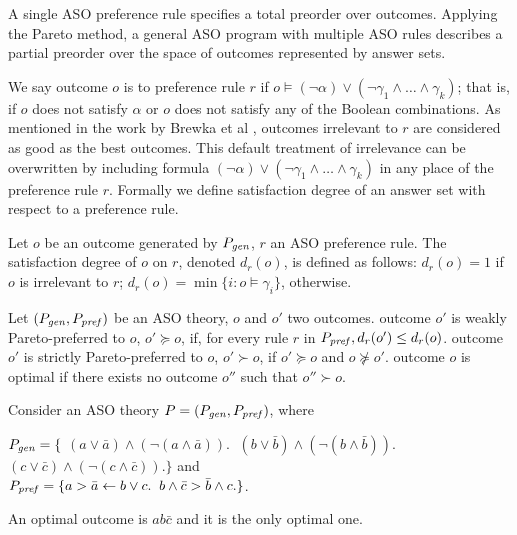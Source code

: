 
A single ASO preference rule specifies a total preorder over outcomes.
Applying the Pareto method, a general ASO program with multiple ASO rules
describes a partial preorder over the space of outcomes represented by answer sets.

We say outcome $o$ is  to preference rule $r$ if
$o \models (\neg \alpha) \vee (\neg \gamma_1 \wedge \ldots \wedge \gamma_k)$;
that is, if $o$ does not satisfy $\alpha$ or $o$ does not satisfy any of
the Boolean combinations. As mentioned in the work by Brewka et al \cite{Brewka03answerset},
outcomes irrelevant to $r$ are considered as good as the
best outcomes.
This default treatment of irrelevance can be overwritten by
including formula $(\neg \alpha) \vee (\neg \gamma_1 \wedge \ldots \wedge \gamma_k)$
in any place of the preference rule $r$.
Formally we define satisfaction degree of an answer set with respect to a
preference rule.
\begin{definition}
	Let $o$ be an outcome generated by $P_{\mathit{gen}}$,
	$r$ an ASO preference rule.
	The satisfaction degree of $o$ on $r$, denoted $d_r(o)$,
	is defined as follows: $d_r(o)=1$ if $o$ is irrelevant to $r$;
	$d_r(o)=\min\{i:o \models \gamma_i\}$, otherwise.
\end{definition}

\begin{definition}
	Let $(P_{\mathit{gen}}, P_{\mathit{pref}})$ be an ASO theory,
	$o$ and $o'$ two outcomes.
	outcome $o'$ is weakly Pareto-preferred to $o$, $o' \succeq o$,
	if, for every rule $r$ in $P_{\mathit{pref}}, d_r(o') \leq d_r(o)$.
	outcome $o'$ is strictly Pareto-preferred to $o$, $o' \succ o$,
	if $o' \succeq o$ and $o \not \succeq o'$.
	outcome $o$ is optimal if there exists no outcome $o''$ such that
	$o'' \succ o$.
\end{definition}

Consider an ASO theory $P=(P_{\mathit{gen}}, P_{\mathit{pref}})$, where
\begin{center}
	$P_{\mathit{gen}}=\{$
	$(a \lor \bar{a}) \land (\neg (a \land \bar{a})). \;$
	$(b \lor \bar{b}) \land (\neg (b \land \bar{b})). \;$
	$(c \lor \bar{c}) \land (\neg (c \land \bar{c})). \}$
	and\\
	$P_{\mathit{pref}}=\{
		a > \bar{a} \leftarrow b \vee c. \;\;
		b \wedge \bar{c} > \bar{b} \wedge c.
	\}$.
\end{center}
An optimal outcome is $ab\bar{c}$ and it is the only optimal one.

